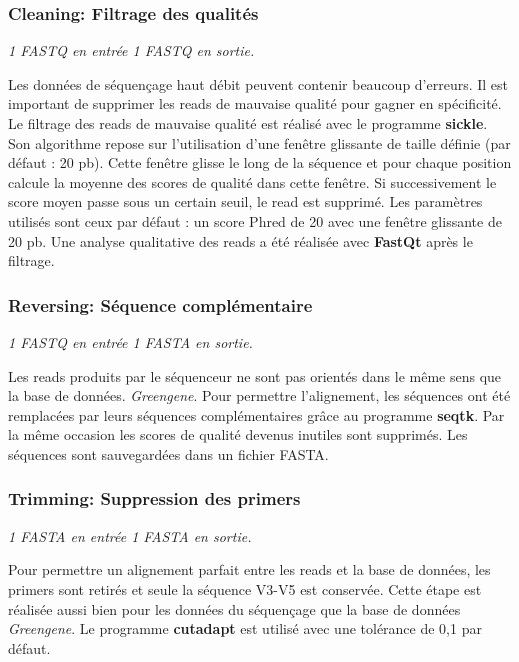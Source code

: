 \documentclass[12pt,a4paper]{article}
\begin{document}
\subsubsection{Cleaning: Filtrage des qualités}
\noindent\emph{1 FASTQ en entrée 1 FASTQ en sortie. }

Les données de séquençage haut débit peuvent contenir beaucoup d'erreurs. Il est important de supprimer les reads de mauvaise qualité pour gagner en spécificité.
Le filtrage des reads de mauvaise qualité est réalisé avec le programme \textbf{sickle}\cite{JoshiNA2011}. Son algorithme repose sur l'utilisation d'une fenêtre glissante de taille définie (par défaut : 20 pb). Cette fenêtre glisse le long de la séquence et pour chaque position calcule la moyenne des scores de qualité dans cette fenêtre. Si successivement le score moyen passe sous un certain seuil, le read est supprimé. Les paramètres utilisés sont ceux par défaut : un score Phred de 20 avec une fenêtre glissante de 20 pb.
Une analyse qualitative des reads a été réalisée avec \textbf{FastQt}\cite{Labsquareteam2017} après le filtrage.


\subsubsection{Reversing: Séquence complémentaire}
\noindent\emph{1 FASTQ en entrée 1 FASTA en sortie. }

Les reads produits par le séquenceur ne sont pas orientés dans le même sens que la base de données. \textit{Greengene}\cite{DeSantis2006}. Pour permettre l'alignement, les séquences ont été remplacées par leurs séquences complémentaires grâce au programme \textbf{seqtk}\cite{H.Li}.
Par la même occasion les scores de qualité devenus inutiles sont supprimés. Les séquences sont sauvegardées dans un fichier FASTA.

\subsubsection{Trimming: Suppression des primers}
\noindent\emph{1 FASTA en entrée 1 FASTA en sortie.}

Pour permettre un alignement parfait entre les reads et la base de données, les primers sont retirés et seule la séquence V3-V5 est conservée. Cette étape est réalisée aussi bien pour les données du séquençage que la base de données \textit{Greengene}.
Le programme \textbf{cutadapt}\cite{Martin2011} est utilisé avec une tolérance de 0,1 par défaut.
\end{document}

